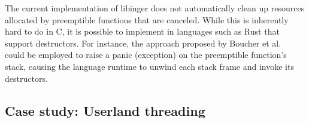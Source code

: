 The current implementation of libinger does not automatically clean up resources
allocated by preemptible functions that are canceled.  While this is inherently hard
to do in C, it is possible to implement in languages such as Rust that support
destructors.  For instance, the approach proposed by Boucher et
al.~\cite{boucher:atc2018} could be employed to raise a panic (exception) on the
preemptible function's stack, causing the language runtime to unwind each stack frame
and invoke its destructors.



\subsection{Case study: Userland threading}
\label{sec:threading}
